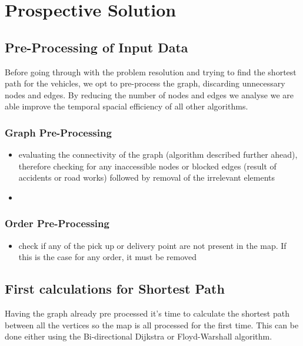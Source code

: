 \chapter{Prospective Solution}


\section{Pre-Processing of Input Data}
Before going through with the problem resolution and trying to find the shortest path for the vehicles, we opt to pre-process the graph, discarding unnecessary nodes and edges. By reducing the number of nodes and edges we analyse we are able improve the temporal spacial efficiency of all other algorithms. 

\subsection{Graph Pre-Processing}
\begin{itemize}
    \item evaluating the connectivity of the graph (algorithm described further ahead), therefore checking for any inaccessible nodes or blocked edges (result of accidents or road works) followed by removal of the irrelevant elements
    \item 
\end{itemize}

\subsection{Order Pre-Processing}
\begin{itemize}
    \item check if any of the pick up or delivery point are not present in the map. If this is the case for any order, it must be removed
\end{itemize}


\section{}

\section{First calculations for Shortest Path}
Having the graph already pre processed it's time to calculate the shortest path between all the vertices so the map is all processed for the first time. This can be done either using the Bi-directional Dijkstra or Floyd-Warshall algorithm. 